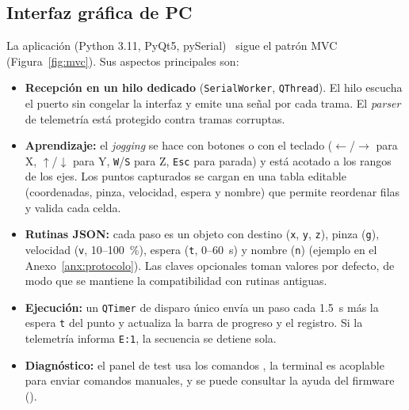 \subsection{Interfaz gráfica de PC}
La aplicación \tails{} (Python 3.11, PyQt5, pySerial)~\cite{pyqt,pyserial} sigue el patrón MVC
(Figura~\ref{fig:mvc}). Sus aspectos principales son:
\begin{itemize}
  \item \textbf{Recepción en un hilo dedicado} (\texttt{SerialWorker}, \texttt{QThread}). El hilo
        escucha el puerto sin congelar la interfaz y emite una señal por cada trama. El
        \emph{parser} de telemetría está protegido contra tramas corruptas.
  \item \textbf{Aprendizaje:} el \emph{jogging} se hace con botones o con el teclado
        ($\leftarrow$/$\rightarrow$ para X, $\uparrow$/$\downarrow$ para Y, \texttt{W}/\texttt{S} para Z,
        \texttt{Esc} para parada) y está acotado a los rangos de los ejes. Los puntos capturados
        se cargan en una tabla editable (coordenadas, pinza, velocidad, espera y nombre) que
        permite reordenar filas y valida cada celda.
  \item \textbf{Rutinas JSON:} cada paso es un objeto con destino (\texttt{x}, \texttt{y},
        \texttt{z}), pinza (\texttt{g}), velocidad (\texttt{v}, 10--100~\%), espera (\texttt{t},
        0--\SI{60}{\second}) y nombre (\texttt{n}) (ejemplo en el Anexo~\ref{anx:protocolo}).
        Las claves opcionales toman valores por defecto, de modo que se mantiene la
        compatibilidad con rutinas antiguas.
  \item \textbf{Ejecución:} un \texttt{QTimer} de disparo único envía un paso cada
        \SI{1,5}{\second} más la espera \texttt{t} del punto y actualiza la barra de progreso y
        el registro. Si la telemetría informa \texttt{E:1}, la secuencia se detiene sola.
  \item \textbf{Diagnóstico:} el panel de test usa los comandos \cmd{:*}, la terminal es
        acoplable para enviar comandos manuales, y se puede consultar la ayuda del firmware
        ().
\end{itemize}


